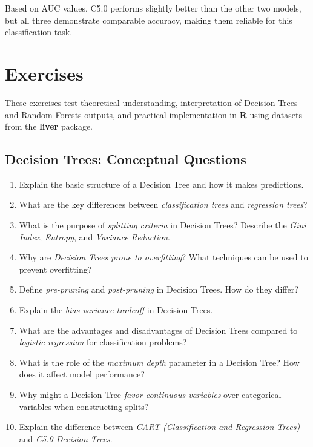 \documentclass[
  11pt,
]{book}
\providecommand{\tightlist}{%
  \setlength{\itemsep}{0pt}\setlength{\parskip}{0pt}}
\theoremstyle{definition}
\theoremstyle{definition}
\theoremstyle{definition}
\theoremstyle{definition}
\theoremstyle{remark}
\begin{document}
Based on AUC values, C5.0 performs slightly better than the other two models, but all three demonstrate comparable accuracy, making them reliable for this classification task.

\section{Exercises}\label{tree-exercises}

These exercises test theoretical understanding, interpretation of Decision Trees and Random Forests outputs, and practical implementation in \textbf{R} using datasets from the \textbf{liver} package.

\subsection*{Decision Trees: Conceptual Questions}\label{decision-trees-conceptual-questions}


\begin{enumerate}
\def\labelenumi{\arabic{enumi}.}
\tightlist
\item
  Explain the basic structure of a Decision Tree and how it makes predictions.\\
\item
  What are the key differences between \emph{classification trees} and \emph{regression trees}?\\
\item
  What is the purpose of \emph{splitting criteria} in Decision Trees? Describe the \emph{Gini Index}, \emph{Entropy}, and \emph{Variance Reduction}.\\
\item
  Why are \emph{Decision Trees prone to overfitting}? What techniques can be used to prevent overfitting?\\
\item
  Define \emph{pre-pruning} and \emph{post-pruning} in Decision Trees. How do they differ?\\
\item
  Explain the \emph{bias-variance tradeoff} in Decision Trees.\\
\item
  What are the advantages and disadvantages of Decision Trees compared to \emph{logistic regression} for classification problems?\\
\item
  What is the role of the \emph{maximum depth} parameter in a Decision Tree? How does it affect model performance?\\
\item
  Why might a Decision Tree \emph{favor continuous variables} over categorical variables when constructing splits?\\
\item
  Explain the difference between \emph{CART (Classification and Regression Trees)} and \emph{C5.0 Decision Trees}.
\end{enumerate}
\end{document}
